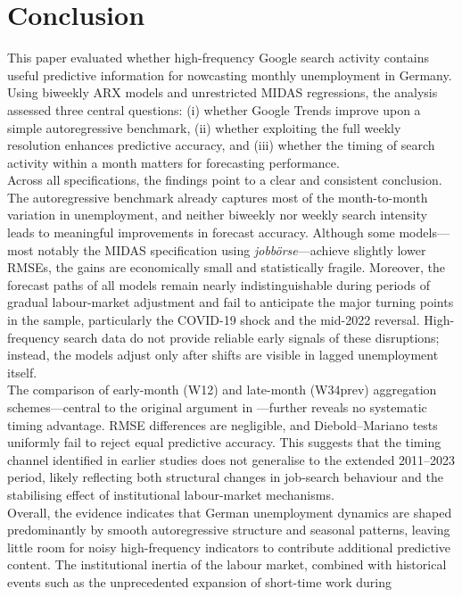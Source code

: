 \documentclass[12pt,a4paper]{article}
\begin{document}
\section{Conclusion}
This paper evaluated whether high-frequency Google search activity contains
useful predictive information for nowcasting monthly unemployment in Germany.
Using biweekly ARX models and unrestricted MIDAS regressions, the analysis
assessed three central questions: (i) whether Google Trends improve upon a
simple autoregressive benchmark, (ii) whether exploiting the full weekly
resolution enhances predictive accuracy, and (iii) whether the timing of search
activity within a month matters for forecasting performance.\\
Across all specifications, the findings point to a clear and consistent
conclusion. The autoregressive benchmark already captures most of the
month-to-month variation in unemployment, and neither biweekly nor weekly search
intensity leads to meaningful improvements in forecast accuracy. Although some
models—most notably the MIDAS specification using \textit{jobbörse}—achieve
slightly lower RMSEs, the gains are economically small and statistically fragile.
Moreover, the forecast paths of all models remain nearly indistinguishable during
periods of gradual labour-market adjustment and fail to anticipate the major
turning points in the sample, particularly the COVID-19 shock and the mid-2022
reversal. High-frequency search data do not provide reliable early signals of
these disruptions; instead, the models adjust only after shifts are visible in
lagged unemployment itself.\\
The comparison of early-month (W12) and late-month (W34prev) aggregation
schemes—central to the original argument in \citet{Askitas}—further reveals no
systematic timing advantage. RMSE differences are negligible, and Diebold–Mariano
tests uniformly fail to reject equal predictive accuracy. This suggests that the
timing channel identified in earlier studies does not generalise to the extended
2011–2023 period, likely reflecting both structural changes in job-search
behaviour and the stabilising effect of institutional labour-market mechanisms.\\
Overall, the evidence indicates that German unemployment dynamics are shaped
predominantly by smooth autoregressive structure and seasonal patterns, leaving
little room for noisy high-frequency indicators to contribute additional
predictive content. The institutional inertia of the labour market, combined with
historical events such as the unprecedented expansion of short-time work during
\end{document}
